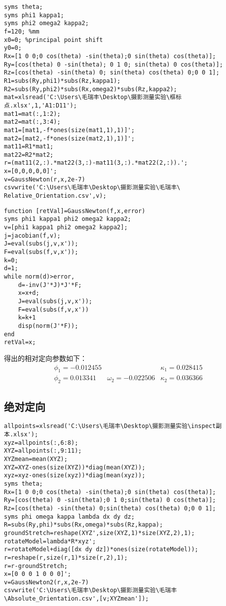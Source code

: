 \begin{lstlisting}[caption=Relative\_Orientation.m文件]
syms theta;
syms phi1 kappa1;
syms phi2 omega2 kappa2;
f=120; %mm
x0=0; %principal point shift
y0=0;
Rx=[1 0 0;0 cos(theta) -sin(theta);0 sin(theta) cos(theta)];
Ry=[cos(theta) 0 -sin(theta); 0 1 0; sin(theta) 0 cos(theta)];
Rz=[cos(theta) -sin(theta) 0; sin(theta) cos(theta) 0;0 0 1];
R1=subs(Ry,phi1)*subs(Rz,kappa1);
R2=subs(Ry,phi2)*subs(Rx,omega2)*subs(Rz,kappa2);
mat=xlsread('C:\Users\毛瑞丰\Desktop\摄影测量实验\框标点.xlsx',1,'A1:D11');
mat1=mat(:,1:2);
mat2=mat(:,3:4);
mat1=[mat1,-f*ones(size(mat1,1),1)]';
mat2=[mat2,-f*ones(size(mat2,1),1)]';
mat11=R1*mat1;
mat22=R2*mat2;
r=(mat11(2,:).*mat22(3,:)-mat11(3,:).*mat22(2,:)).';
x=[0,0,0,0,0]';
v=GaussNewton(r,x,2e-7)
csvwrite('C:\Users\毛瑞丰\Desktop\摄影测量实验\毛瑞丰\ Relative_Orientation.csv',v);
\end{lstlisting}


\begin{lstlisting}[caption=Absolute\_Orientation.m文件]
function [retVal]=GaussNewton(f,x,error)
syms phi1 kappa1 phi2 omega2 kappa2;
v=[phi1 kappa1 phi2 omega2 kappa2];
j=jacobian(f,v);
J=eval(subs(j,v,x'));
F=eval(subs(f,v,x'));
k=0;
d=1;
while norm(d)>error,
    d=-inv(J'*J)*J'*F;
    x=x+d;
    J=eval(subs(j,v,x'));
    F=eval(subs(f,v,x'))
    k=k+1
    disp(norm(J'*F));
end
retVal=x;
\end{lstlisting}

得出的相对定向参数如下：
\begin{equation}
\begin{array}{lll}
\phi_1=-0.012455 & & \kappa_1=0.028415 \\
\phi_2=0.013341 & \omega_2=-0.022506 & \kappa_2=0.036366
\end{array}
\end{equation}

\subsection{绝对定向}

\begin{lstlisting}[caption=Absolute\_Orientation.m文件]
allpoints=xlsread('C:\Users\毛瑞丰\Desktop\摄影测量实验\inspect副本.xlsx');
xyz=allpoints(:,6:8);
XYZ=allpoints(:,9:11);
XYZmean=mean(XYZ);
XYZ=XYZ-ones(size(XYZ))*diag(mean(XYZ));
xyz=xyz-ones(size(xyz))*diag(mean(xyz));
syms theta;
Rx=[1 0 0;0 cos(theta) -sin(theta);0 sin(theta) cos(theta)];
Ry=[cos(theta) 0 -sin(theta);0 1 0;sin(theta) 0 cos(theta)];
Rz=[cos(theta) -sin(theta) 0;sin(theta) cos(theta) 0;0 0 1];
syms phi omega kappa lambda dx dy dz;
R=subs(Ry,phi)*subs(Rx,omega)*subs(Rz,kappa);
groundStretch=reshape(XYZ',size(XYZ,1)*size(XYZ,2),1);
rotateModel=lambda*R*xyz';
r=rotateModel+diag([dx dy dz])*ones(size(rotateModel));
r=reshape(r,size(r,1)*size(r,2),1);
r=r-groundStretch;
x=[0 0 0 1 0 0 0]';
v=GaussNewton2(r,x,2e-7)
csvwrite('C:\Users\毛瑞丰\Desktop\摄影测量实验\毛瑞丰\Absolute_Orientation.csv',[v;XYZmean']);
\end{lstlisting}



